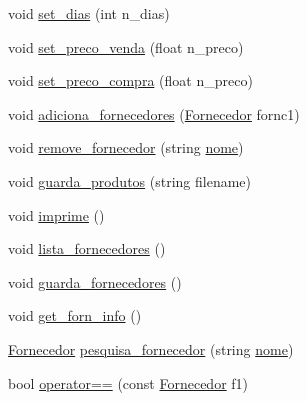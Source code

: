 \begin{DoxyCompactItemize}
\item 
void \hyperlink{class_produto_a13ad4edac814b51f575456a29c830f1e}{set\_\-dias} (int n\_\-dias)
\item 
void \hyperlink{class_produto_aa299ac1f76a7fcd150ed746510dd05f4}{set\_\-preco\_\-venda} (float n\_\-preco)
\item 
void \hyperlink{class_produto_adb2b062c490ecd39f8c6ef7055b97fc7}{set\_\-preco\_\-compra} (float n\_\-preco)
\item 
void \hyperlink{class_produto_aa2c03adf0974137dcbf87cca3282ac06}{adiciona\_\-fornecedores} (\hyperlink{class_fornecedor}{Fornecedor} fornc1)
\item 
void \hyperlink{class_produto_abe6db309f39f9c82d06b1ed0b353a137}{remove\_\-fornecedor} (string \hyperlink{class_produto_a68b0af895e00da960bea4fb9d22908a4}{nome})
\item 
void \hyperlink{class_produto_ae15cb3f7a8c4e6edfa1cd19edf9a2633}{guarda\_\-produtos} (string filename)
\item 
void \hyperlink{class_produto_ae2db3ae48b36975ffa88eee79bcbe38c}{imprime} ()
\item 
void \hyperlink{class_produto_a6f78004a903906f6f9545116bc97ed18}{lista\_\-fornecedores} ()
\item 
void \hyperlink{class_produto_a5a7532a0022fe2e8d5c778b95e61844f}{guarda\_\-fornecedores} ()
\item 
void \hyperlink{class_produto_a6c03a015018be869738a9ca28d8a5e1c}{get\_\-forn\_\-info} ()
\item 
\hyperlink{class_fornecedor}{Fornecedor} \hyperlink{class_produto_aba2e9b3507f02bffcb23c0230060a8e2}{pesquisa\_\-fornecedor} (string \hyperlink{class_produto_a68b0af895e00da960bea4fb9d22908a4}{nome})
\item 
bool \hyperlink{class_produto_a9bdfbd47b5b2ccfa5c012853537b9e73}{operator==} (const \hyperlink{class_fornecedor}{Fornecedor} f1)
\end{DoxyCompactItemize}
